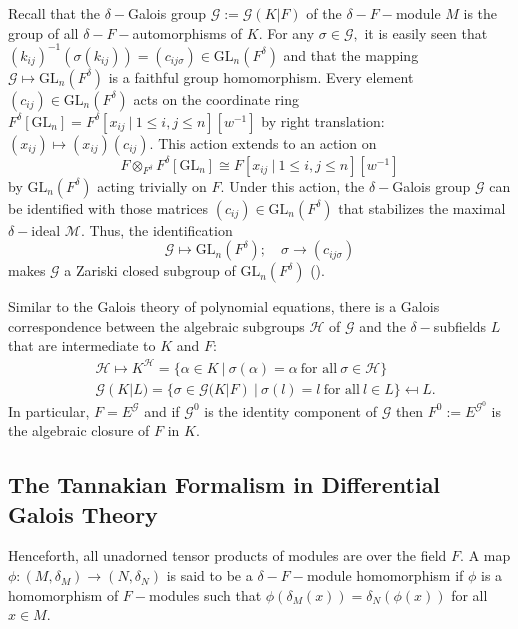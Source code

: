 \documentclass[preprint, 11pt]{amsart}
\theoremstyle{corollary}
\theoremstyle{remark}
\theoremstyle{proposition}
\numberwithin{equation}{subsection}
\begin{document}
Recall that the $\delta-$Galois group $\mathscr G:=\mathscr{G}(K|F)$ of the $\delta-F-$module $M$  is the group of all $\delta-F-$automorphisms  of $K.$ For any $\sigma\in \mathscr G,$ it is easily seen that $(k_{ij})^{-1}(\sigma(k_{ij}))=(c_{ij\sigma})\in\mathrm{GL}_n(F^{\delta})$ and that the mapping $\mathscr G\mapsto\mathrm{GL}_n(F^{\delta})$ is a faithful group homomorphism.  Every element $(c_{ij})\in\mathrm{GL}_n(F^{\delta})$ acts on the coordinate ring $F^{\delta}[\mathrm{GL}_n]=F^{\delta}[x_{ij}\ |\ 1\leq i,j\leq n][w^{-1}]$ by right translation: $(x_{ij})\mapsto (x_{ij})(c_{ij}).$  This action extends to an action on $$F\otimes_{F^{\delta}} F^{\delta}[\mathrm{GL}_n]\cong F[x_{ij}\ |\ 1\leq i,j\leq n][w^{-1}]$$ by $\mathrm{GL}_n(F^\delta)$ acting trivially on $F.$  Under this action, the $\delta-$Galois group $\mathscr G$ can be identified with those matrices $(c_{ij})\in\mathrm{GL}_n(F^{\delta})$ that stabilizes the maximal $\delta-$ideal $\mathscr M.$ Thus, the identification \begin{equation*}\mathscr G\mapsto\mathrm{GL}_n(F^{\delta});\quad \sigma\to (c_{ij\sigma})\end{equation*} 
makes $\mathscr G$ a Zariski closed subgroup of $\mathrm{GL}_n(F^{\delta})$ (\cite[Observation 1.26 \& Theorem 1.27]{MvdP03}). 

Similar to the Galois theory of polynomial equations,  there is a Galois correspondence between the  algebraic subgroups $\mathscr{H}$ of $\mathscr G$ and the $\delta-$subfields $L$ that are intermediate to $K$ and $F:$ 
\begin{align*} &\mathscr H \mapsto K^\mathscr{H}=\{\alpha\in K\ | \ \sigma(\alpha)=\alpha\ \text{for all}\ \sigma\in \mathscr{H}\} \\  & \mathscr G(K|L)=\{\sigma\in \mathscr G(K|F)\ | \ \sigma(l)=l \ \text{for all}\ l\in L\}\mapsfrom L.\end{align*} In particular, $F=E^\mathscr{G}$ and if $\mathscr G^0$ is the identity component of $\mathscr G$ then $F^0:=E^{\mathscr G^0}$ is the algebraic closure of $F$ in $K.$
 



\subsection{The Tannakian Formalism in Differential Galois Theory} \label{tannakianformalism} Henceforth, all unadorned tensor products of modules are over the field $F.$
A map $\phi: (M, \delta_M)\to (N, \delta_N)$ is said to be a $\delta-F-$module homomorphism if $\phi$ is a homomorphism of $F-$modules such that $\phi(\delta_M(x))=\delta_N(\phi(x))$ for all $x\in M.$ 
\end{document}
